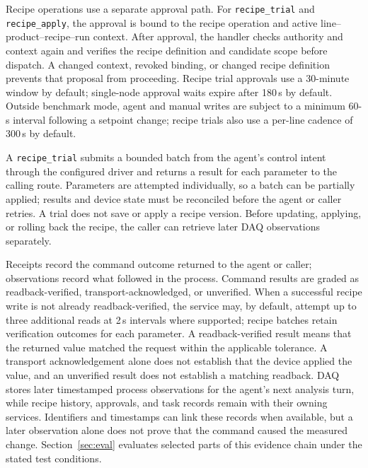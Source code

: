 \documentclass[journal]{IEEEtran}
\begin{document}
Recipe operations use a separate approval path. For \texttt{recipe\_trial}
and \texttt{recipe\_apply}, the approval is bound to the recipe operation and
active line--product--recipe--run context. After approval, the handler checks
authority and context again and verifies the recipe definition and
candidate scope before dispatch. A changed context, revoked binding, or
changed recipe definition prevents that proposal from proceeding. Recipe
trial approvals use a 30-minute window by default; single-node approval waits
expire after 180\,s by default. Outside benchmark mode, agent and manual
writes are subject to a minimum 60-s interval following a setpoint change;
recipe trials also use a per-line cadence of 300\,s by default.

A \texttt{recipe\_trial} submits a bounded batch from the agent's control intent through the configured
driver and returns a result for each parameter to the calling route. Parameters are attempted
individually, so a batch can be partially applied; results and device state
must be reconciled before the agent or caller retries. A trial does not save or apply a recipe
version. Before updating, applying, or rolling back the recipe, the caller can
retrieve later DAQ observations separately.

Receipts record the command outcome returned to the agent or caller; observations record what followed in
the process. Command results are graded as readback-verified,
transport-acknowledged, or unverified. When a successful recipe write is not
already readback-verified, the service may, by default, attempt up to three additional
reads at 2\,s intervals where supported; recipe batches retain verification
outcomes for each parameter. A readback-verified result means that the
returned value matched the request within the applicable tolerance. A transport
acknowledgement alone does not establish that the device applied the value, and
an unverified result does not establish a matching readback. DAQ stores later
timestamped process observations for the agent's next analysis turn, while
recipe history, approvals, and task records remain with their owning services.
Identifiers and timestamps can link these records when available, but a later
observation alone does not prove that the command caused the measured change.
Section~\ref{sec:eval} evaluates selected parts of this evidence chain under the
stated test conditions.
\end{document}
